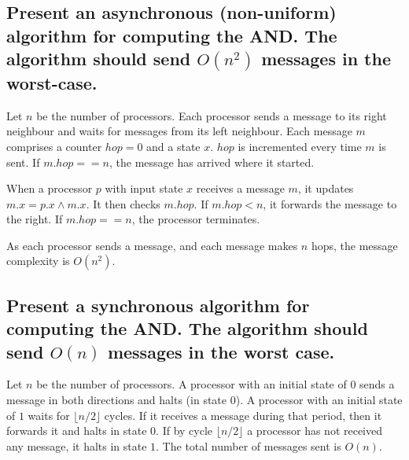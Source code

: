 \documentclass[11pt]{article} %
\begin{document}
\subsection{Present an asynchronous (non-uniform) algorithm for computing the AND. The algorithm should send $O(n^2)$ messages in the worst-case.}

Let $n$ be the number of processors. Each processor sends a message to its right neighbour and waits for messages from its left neighbour. Each message $m$ comprises a counter $hop = 0$ and a state $x$. $hop$ is incremented every time $m$ is sent. If $m.hop == n$, the message has arrived where it started. 

When a processor $p$ with input state $x$ receives a message $m$, it updates $m.x = p.x \land m.x$. It then checks $m.hop$. If $m.hop < n$, it forwards the message to the right. If $m.hop == n$, the processor terminates. 

As each processor sends a message, and each message makes $n$ hops, the message complexity is $O(n^2)$.

\subsection{Present a synchronous algorithm for computing the AND. The algorithm should send $O(n)$ messages in the worst case.}

Let $n$ be the number of processors. A processor with an initial state of $0$ sends a message in both directions and halts (in state $0$). A processor with an initial state of $1$ waits for $\lfloor n / 2 \rfloor$ cycles. If it receives a message during that period, then it forwards it and halts in state $0$. If by cycle $\lfloor n / 2 \rfloor$ a processor has not received any message, it halts in state $1$. The total number of messages sent is $O(n)$.
\end{document}
